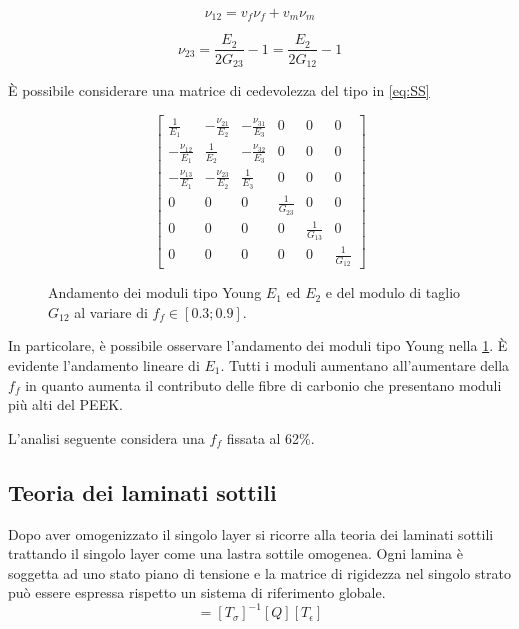 \documentclass[a4paper,num-refs]{oup-contemporary}
\begin{document}
\begin{equation}
\nu_{12}=v_{f} \nu_{f}+v_{m} \nu_{m}
	\label{eq:nu12}
\end{equation}

\begin{equation}
\nu_{23}=\frac{E_{2}}{2 G_{23}}-1=\frac{E_{2}}{2 G_{12}}-1
	\label{eq:nu23}
\end{equation}

È possibile considerare una matrice di cedevolezza del tipo in \cref{eq:SS}

\begin{equation}
\begin{bmatrix}
	\frac{1}{E_{1}} & -\frac{\nu_{21}}{E_{2}} & -\frac{\nu_{31}}{E_{3}} & 0 & 0 & 0 \\
	-\frac{\nu_{12}}{E_{1}} & \frac{1}{E_{2}} & -\frac{\nu_{32}}{E_{3}} & 0 & 0 & 0 \\
	-\frac{\nu_{13}}{E_{1}} & -\frac{\nu_{23}}{E_{2}} & \frac{1}{E_{3}} & 0 & 0 & 0 \\
	0 & 0 & 0 & \frac{1}{G_{23}} & 0 & 0 \\
	0 & 0 & 0 & 0 & \frac{1}{G_{13}} & 0 \\
	0 & 0 & 0 & 0 & 0 & \frac{1}{G_{12}}
\end{bmatrix}
\label{eq:SS}
\end{equation}

\begin{figure}
\def\svgwidth{\linewidth}
  
	\caption{Andamento dei moduli tipo Young $E_1$ ed $E_2$ e del modulo di taglio $G_{12}$ al variare di $f_f\in \left[0.3;0.9\right]$.}
		\label{fig:mixtureRule} 
\end{figure}

In particolare, è possibile osservare l'andamento dei moduli tipo Young nella \cref{fig:mixtureRule}. È evidente l'andamento lineare di $E_1$. Tutti i moduli aumentano all'aumentare della $f_f$ in quanto aumenta il contributo delle fibre di carbonio che presentano moduli più alti del PEEK. 

L'analisi seguente considera una $f_f$ fissata al 62\%. 




\subsection{Teoria dei laminati sottili }

Dopo aver omogenizzato il singolo layer si ricorre alla teoria dei laminati sottili \citep{SOTTILI} trattando il singolo layer come una lastra sottile omogenea. Ogni lamina è soggetta ad uno stato piano di tensione e la matrice di rigidezza nel singolo strato può essere espressa rispetto un sistema di riferimento globale. 
\begin{equation}
[\bar{Q}]=\left[T_{\sigma}\right]^{-1}[Q]\left[T_{\epsilon}\right]
\label{eq:rotazione}
\end{equation}
\end{document}
